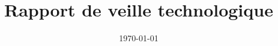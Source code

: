 \title{\vspace{1.5cm}Rapport de veille technologique \\ \vspace{0.25cm} \LARGE{\textbf{\projecttitle}}}
\author{}
\date{\today}